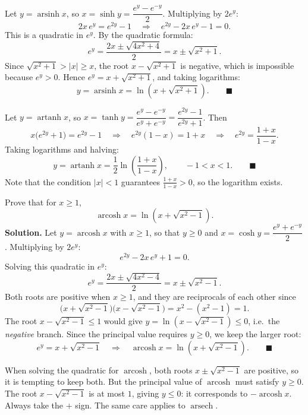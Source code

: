 \documentclass[11pt]{article}
\begin{document}
\begin{exemplebox}[Derivation of $\operatorname{arsinh} x = \ln(x+\sqrt{x^2+1})$]
Let $y = \operatorname{arsinh} x$, so $x = \sinh y = \dfrac{e^y - e^{-y}}{2}$. Multiplying by $2e^y$:
\[
2x\,e^y = e^{2y} - 1 \quad\Longrightarrow\quad e^{2y} - 2x\,e^y - 1 = 0.
\]
This is a quadratic in $e^y$. By the quadratic formula:
\[
e^y = \frac{2x \pm \sqrt{4x^2+4}}{2} = x \pm \sqrt{x^2+1}.
\]
Since $\sqrt{x^2+1} > |x| \geq x$, the root $x - \sqrt{x^2+1}$ is negative, which is impossible because $e^y > 0$. Hence $e^y = x + \sqrt{x^2+1}$, and taking logarithms:
\[
y = \operatorname{arsinh} x = \ln\!\left(x + \sqrt{x^2+1}\right). \qquad \blacksquare
\]
\end{exemplebox}

\begin{exemplebox}
Let $y = \operatorname{artanh} x$, so $x = \tanh y = \dfrac{e^y - e^{-y}}{e^y + e^{-y}} = \dfrac{e^{2y}-1}{e^{2y}+1}$. Then
\[
x\bigl(e^{2y}+1\bigr) = e^{2y} - 1
\quad\Longrightarrow\quad
e^{2y}(1 - x) = 1 + x
\quad\Longrightarrow\quad
e^{2y} = \frac{1+x}{1-x}.
\]
Taking logarithms and halving:
\[
y = \operatorname{artanh} x = \frac{1}{2}\ln\!\left(\frac{1+x}{1-x}\right), \qquad -1 < x < 1. \qquad \blacksquare
\]
Note that the condition $|x|<1$ guarantees $\frac{1+x}{1-x} > 0$, so the logarithm exists.
\end{exemplebox}

\begin{exoresolu}
Prove that for $x \geq 1$,
\[
\operatorname{arcosh} x = \ln\!\left(x + \sqrt{x^2-1}\right).
\]
\tcblower
\textbf{Solution.} Let $y = \operatorname{arcosh} x$ with $x \geq 1$, so that $y \geq 0$ and $x = \cosh y = \dfrac{e^y + e^{-y}}{2}$. Multiplying by $2e^y$:
\[
e^{2y} - 2x\,e^y + 1 = 0.
\]
Solving this quadratic in $e^y$:
\[
e^y = \frac{2x \pm \sqrt{4x^2 - 4}}{2} = x \pm \sqrt{x^2 - 1}.
\]
Both roots are positive when $x \geq 1$, and they are reciprocals of each other since
\[
\bigl(x+\sqrt{x^2-1}\bigr)\bigl(x-\sqrt{x^2-1}\bigr) = x^2 - (x^2-1) = 1.
\]
The root $x - \sqrt{x^2-1} \leq 1$ would give $y = \ln(x-\sqrt{x^2-1}) \leq 0$, i.e.\ the \emph{negative} branch. Since the principal value requires $y \geq 0$, we keep the larger root:
\[
e^y = x + \sqrt{x^2-1} \quad\Longrightarrow\quad \operatorname{arcosh} x = \ln\!\left(x + \sqrt{x^2-1}\right). \qquad \blacksquare
\]
\end{exoresolu}

\begin{attention}
When solving the quadratic for $\operatorname{arcosh}$, both roots $x \pm \sqrt{x^2-1}$ are positive, so it is tempting to keep both. But the principal value of $\operatorname{arcosh}$ must satisfy $y \geq 0$. The root $x - \sqrt{x^2-1}$ is at most $1$, giving $y \leq 0$: it corresponds to $-\operatorname{arcosh} x$. Always take the $+$ sign. The same care applies to $\operatorname{arsech}$.
\end{attention}
\end{document}
